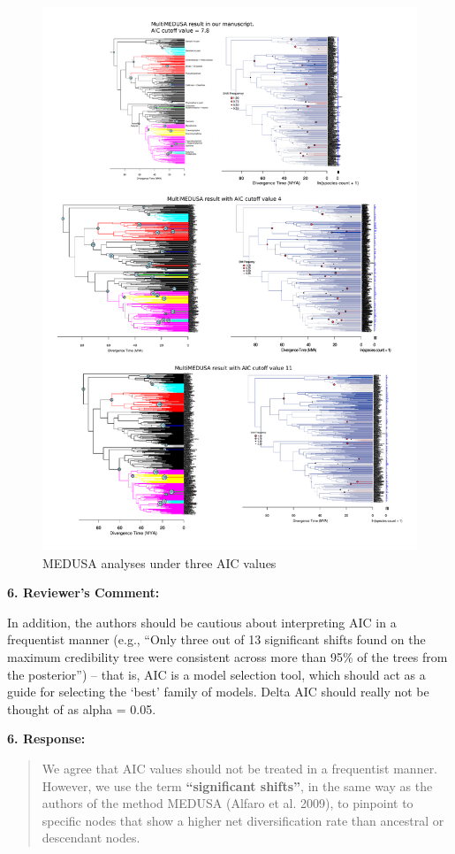 \documentclass[]{article}
\begin{document}
\begin{figure}[htbp]
\centering
\includegraphics{multimedusa_7_8_vs_4_vs_11_AIC_cutoff.pdf}
\caption{MEDUSA analyses under three AIC values}
\end{figure}

\textbf{6. Reviewer's Comment:}

In addition, the authors should be cautious about interpreting AIC in a
frequentist manner (e.g., ``Only three out of 13 significant shifts
found on the maximum credibility tree were consistent across more than
95\% of the trees from the posterior'') -- that is, AIC is a model
selection tool, which should act as a guide for selecting the `best'
family of models. Delta AIC should really not be thought of as alpha =
0.05.

\textbf{6. Response:}

\begin{quote}
\color{blue}
We agree that AIC values should not be treated in a frequentist manner.
However, we use the term \textbf{``significant shifts''}, in the same
way as the authors of the method MEDUSA (Alfaro et al. 2009), to
pinpoint to specific nodes that show a higher net diversification rate
than ancestral or descendant nodes.
\end{quote}
\end{document}
